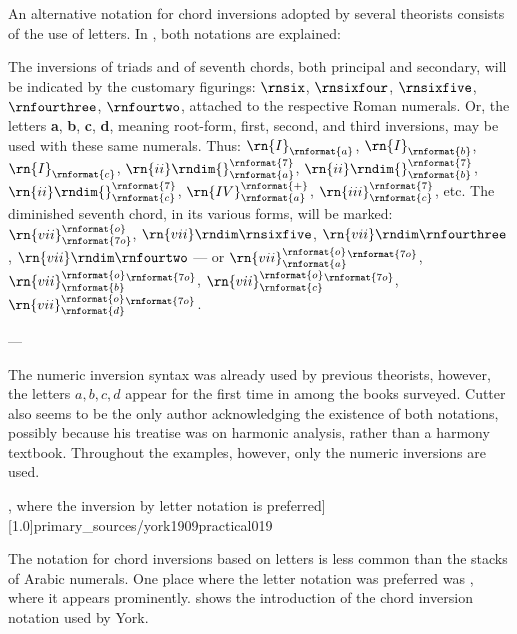 An alternative notation for chord inversions adopted by
several theorists consists of the use of letters. In
\textcite{cutter1902harmonic}, both notations are explained:

\begin{italicsquote}
    The inversions of triads and of seventh chords, both
    principal and secondary, will be indicated by the
    customary figurings: $\rnsix$, $\rnsixfour$,
    $\rnsixfive$, $\rnfourthree$, $\rnfourtwo$, attached to
    the respective Roman numerals. Or, the letters
    \textbf{a}, \textbf{b}, \textbf{c}, \textbf{d}, meaning
    root-form, first, second, and third inversions, may be
    used with these same numerals. Thus:
    $\rn{I}_\rnformat{a}$, $\rn{I}_\rnformat{b}$,
    $\rn{I}_\rnformat{c}$,
    $\rn{ii}\rndim{}^\rnformat{7}_\rnformat{a}$,
    $\rn{ii}\rndim{}^\rnformat{7}_\rnformat{b}$,
    $\rn{ii}\rndim{}^\rnformat{7}_\rnformat{c}$,
    $\rn{IV}^\rnformat{+}_\rnformat{a}$,
    $\rn{iii}^\rnformat{7}_\rnformat{c}$, etc. The
    diminished seventh chord, in its various forms, will be
    marked: $\rn{vii}^\rnformat{o}_\rnformat{7o}$,
    $\rn{vii}\rndim\rnsixfive$,
    $\rn{vii}\rndim\rnfourthree$, $\rn{vii}\rndim\rnfourtwo$
    --- or
    $\rn{vii}^{\rnformat{o}}_{\rnformat{a}}{}^\rnformat{7o}$,
    $\rn{vii}^{\rnformat{o}}_{\rnformat{b}}{}^\rnformat{7o}$,
    $\rn{vii}^{\rnformat{o}}_{\rnformat{c}}{}^\rnformat{7o}$,
    $\rn{vii}^{\rnformat{o}}_{\rnformat{d}}{}^\rnformat{7o}$.

    --- \emph{\textcite[p.~4]{cutter1902harmonic}}
\end{italicsquote}

The numeric inversion syntax was already used by previous
theorists, however, the letters ${a, b, c , d}$ appear for
the first time in \textcite{cutter1902harmonic} among the
books surveyed. Cutter also seems to be the only author
acknowledging the existence of both notations, possibly
because his treatise was on harmonic analysis, rather than a
harmony textbook. Throughout the examples, however, only the
numeric inversions are used.


\phdfigure[\textcite[p.~19]{york1909practical}, where the
inversion by letter notation is
preferred][1.0]{primary_sources/york1909practical019}

The notation for chord inversions based on letters is less
common than the stacks of Arabic numerals. One place where
the letter notation was preferred was
\textcite{york1909practical}, where it appears prominently.
 shows the
introduction of the chord inversion notation used by York.
